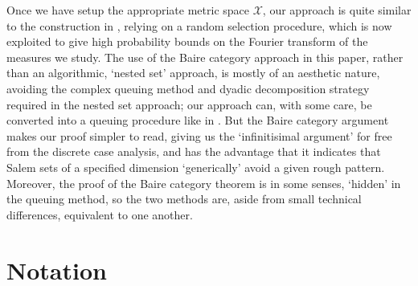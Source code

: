 \documentclass[12pt,reqno]{article}
\numberwithin{equation}{section}
\begin{document}
Once we have setup the appropriate metric space $\mathcal{X}$, our approach is quite similar to the construction in \cite{OurPaper}, relying on a random selection procedure, which is now exploited to give high probability bounds on the Fourier transform of the measures we study. The use of the Baire category approach in this paper, rather than an algorithmic, `nested set' approach, is mostly of an aesthetic nature, avoiding the complex queuing method and dyadic decomposition strategy required in the nested set approach; our approach can, with some care, be converted into a queuing procedure like in \cite{OurPaper}. But the Baire category argument makes our proof simpler to read, giving us the `infinitisimal argument' for free from the discrete case analysis, and has the advantage that it indicates that Salem sets of a specified dimension `generically' avoid a given rough pattern. Moreover, the proof of the Baire category theorem is in some senses, `hidden' in the queuing method, so the two methods are, aside from small technical differences, equivalent to one another.

\section{Notation} \label{notationSection}
\end{document}
